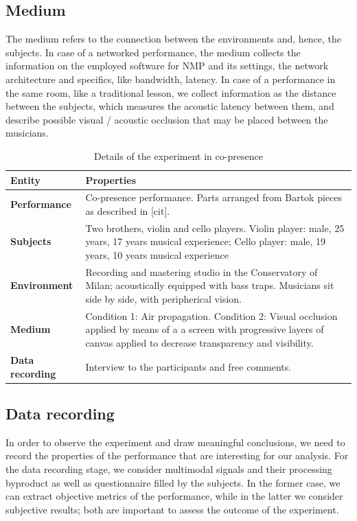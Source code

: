 \subsection{Medium}
The medium refers to the connection between the environments and, hence, the subjects. In case of a networked performance, the medium collects the information on the employed software for NMP and its settings, the network architecture and specifics, like bandwidth, latency. In case of a performance in the same room, like a traditional lesson, we collect information as the distance between the subjects, which measures the acoustic latency between them, and describe possible visual / acoustic occlusion that may be placed between the musicians. 


\begin{table}
	\centering
	\caption{Details of the experiment in co-presence}
	\begin{tabular}{p{1.5cm}p{6cm}}
		\hline
		\textbf{Entity} & \textbf{Properties} \\
		\hline
		\textbf{Performance} & Co-presence performance. \newline Parts arranged from Bartok pieces as described in [cit]. \\
		\textbf{Subjects} & Two brothers, violin and cello players. \newline Violin player: male, 25 years, 17 years musical experience; 	\newline Cello player: male, 19 years, 10 years  musical experience \\
		\textbf{Environment} & Recording and mastering studio in the Conservatory of Milan; acoustically equipped with bass traps. \newline Musicians sit side by side, with peripherical vision.\\
		\textbf{Medium} & Condition 1: Air propagation. \newline Condition 2: Visual occlusion applied by means of a a screen with progressive layers of canvas applied to decrease transparency and visibility. \\
		\textbf{Data} \newline \textbf{recording}  & Interview to the participants and free comments.\\
		\hline
	\end{tabular}
	\label{tab:exp1}
\end{table}


\subsection{Data recording}
In order to observe the experiment and draw meaningful conclusions, we need to record the properties of the performance that are interesting for our analysis. For the data recording stage, we consider multimodal signals and their processing byproduct as well as questionnaire filled by the subjects. In the former case, we can extract objective metrics of the performance, while in the latter we consider subjective results; both are important to assess the outcome of the experiment. 

